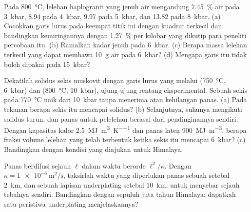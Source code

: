 \begin{exercise}[$\star\star$]\label{exo:b2:crustal-melting:9}
Pada \qty{800}{\celsius}, lelehan haplogranit yang jenuh air mengandung \qty{7.45}{\percent}
air pada \qty{3}{kbar}, 8.94 pada \qty{4}{kbar}, 9.97 pada \qty{5}{kbar}, dan 13.82 pada
\qty{8}{kbar}. (a) Cocokkan garis lurus pada keempat titik ini dengan kuadrat terkecil dan bandingkan
kemiringannya dengan \qty{1.27}{\percent} per kilobar yang dikutip para peneliti percobaan itu.
(b) Ramalkan kadar jenuh pada \qty{6}{kbar}. (c) Berapa massa lelehan terkecil
yang dapat membawa \qty{10}{\gram} air pada \qty{6}{kbar}? (d) Mengapa garis itu tidak boleh
dipakai pada \qty{15}{kbar}?
\end{exercise}

\begin{exercise}[$\star\star\star$]\label{exo:b2:crustal-melting:10}
Dekatilah solidus  sekis muskovit dengan garis lurus yang melalui
(\qty{750}{\celsius}, \qty{6}{kbar}) dan (\qty{800}{\celsius}, \qty{10}{kbar}),
ujung-ujung rentang eksperimental. Sebuah sekis pada \qty{770}{\celsius} naik dari
\qty{10}{kbar} tanpa menerima atau kehilangan panas. (a) Pada tekanan berapa sekis itu mencapai
solidus? (b) Selanjutnya, suhunya mengikuti solidus turun, dan panas untuk pelelehan berasal
dari pendinginannya sendiri. Dengan kapasitas kalor \qty{2.5}{\mega\joule\per\cubic\metre\per\kelvin}
dan panas laten \qty{900}{\mega\joule\per\cubic\metre}, berapa fraksi volume lelehan
yang telah terbentuk ketika sekis itu mencapai \qty{6}{kbar}? (c) Bandingkan dengan kondisi yang diajukan untuk
 Himalaya.
\end{exercise}

\begin{exercise}[$\star\star\star$]\label{exo:b2:crustal-melting:11}
Panas berdifusi sejauh $\ell$ dalam waktu berorde $\ell^2/\kappa$. Dengan
$\kappa = \qty{1e-6}{\square\metre\per\second}$, taksirlah waktu yang diperlukan panas sebuah 
setebal \qty{2}{km}, dan sebuah lapisan underplating setebal \qty{10}{km}, untuk menyebar sejauh
tebalnya sendiri. Bandingkan dengan sepuluh juta tahun  Himalaya: dapatkah satu
peristiwa underplating menjelaskannya?
\end{exercise}

